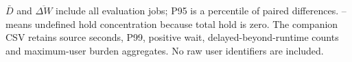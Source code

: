 \noindent\begin{minipage}{\linewidth}\footnotesize $\bar D$ and $\overline{\Delta W}$ include all evaluation jobs; P95 is a percentile of paired differences. -- means undefined hold concentration because total hold is zero. The companion CSV retains source seconds, P99, positive wait, delayed-beyond-runtime counts and maximum-user burden aggregates. No raw user identifiers are included.
\end{minipage}\par
\endgroup
